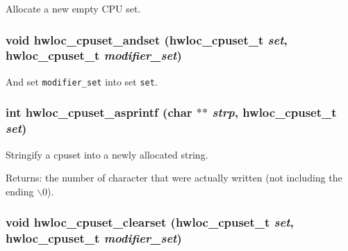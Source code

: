 Allocate a new empty CPU set. 

\hypertarget{group__hwlocality__cpuset_gbc1bfa0483f52c3ddb58530076faba07}{
\subsubsection[{hwloc\_\-cpuset\_\-andset}]{\setlength{\rightskip}{0pt plus 5cm}void hwloc\_\-cpuset\_\-andset ({\bf hwloc\_\-cpuset\_\-t} {\em set}, \/  {\bf hwloc\_\-cpuset\_\-t} {\em modifier\_\-set})}}
\label{group__hwlocality__cpuset_gbc1bfa0483f52c3ddb58530076faba07}


And set {\tt modifier\_\-set} into set {\tt set}. 

\hypertarget{group__hwlocality__cpuset_ge2ebb56edf26097a355f24d859c56713}{
\subsubsection[{hwloc\_\-cpuset\_\-asprintf}]{\setlength{\rightskip}{0pt plus 5cm}int hwloc\_\-cpuset\_\-asprintf (char $\ast$$\ast$ {\em strp}, \/  {\bf hwloc\_\-cpuset\_\-t} {\em set})}}
\label{group__hwlocality__cpuset_ge2ebb56edf26097a355f24d859c56713}


Stringify a cpuset into a newly allocated string. 

\begin{Desc}
\item[Returns:]the number of character that were actually written (not including the ending $\backslash$0). \end{Desc}
\hypertarget{group__hwlocality__cpuset_gfa939b045440ec9654cf58c2a497bfd0}{
\subsubsection[{hwloc\_\-cpuset\_\-clearset}]{\setlength{\rightskip}{0pt plus 5cm}void hwloc\_\-cpuset\_\-clearset ({\bf hwloc\_\-cpuset\_\-t} {\em set}, \/  {\bf hwloc\_\-cpuset\_\-t} {\em modifier\_\-set})}}
\label{group__hwlocality__cpuset_gfa939b045440ec9654cf58c2a497bfd0}


